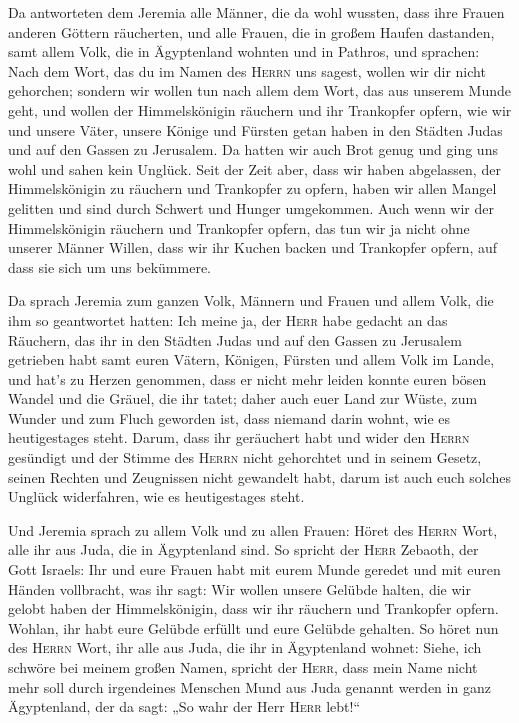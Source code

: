  Da antworteten dem Jeremia alle Männer, die da wohl
wussten, dass ihre Frauen anderen Göttern räucherten, und alle Frauen,
die in großem Haufen dastanden, samt allem Volk, die in Ägyptenland
wohnten und in Pathros, und sprachen:  Nach dem Wort, das
du im Namen des \textsc{Herrn} uns sagest, wollen wir dir nicht
gehorchen;  sondern wir wollen tun nach allem dem Wort,
das aus unserem Munde geht, und wollen der Himmelskönigin räuchern und
ihr Trankopfer opfern, wie wir und unsere Väter, unsere Könige und
Fürsten getan haben in den Städten Judas und auf den Gassen zu
Jerusalem. Da hatten wir auch Brot genug und ging uns wohl und sahen
kein Unglück.  Seit der Zeit aber, dass wir haben
abgelassen, der Himmelskönigin zu räuchern und Trankopfer zu opfern,
haben wir allen Mangel gelitten und sind durch Schwert und Hunger
umgekommen.  Auch wenn wir der Himmelskönigin räuchern
und Trankopfer opfern, das tun wir ja nicht ohne unserer Männer Willen,
dass wir ihr Kuchen backen und Trankopfer opfern, auf dass sie sich um
uns bekümmere.

 Da sprach Jeremia zum ganzen Volk, Männern und Frauen
und allem Volk, die ihm so geantwortet hatten:  Ich meine
ja, der \textsc{Herr} habe gedacht an das Räuchern, das ihr in den
Städten Judas und auf den Gassen zu Jerusalem getrieben habt samt euren
Vätern, Königen, Fürsten und allem Volk im Lande, und hat's zu Herzen
genommen,  dass er nicht mehr leiden konnte euren bösen
Wandel und die Gräuel, die ihr tatet; daher auch euer Land zur Wüste,
zum Wunder und zum Fluch geworden ist, dass niemand darin wohnt, wie es
heutigestages steht.  Darum, dass ihr geräuchert habt und
wider den \textsc{Herrn} gesündigt und der Stimme des \textsc{Herrn}
nicht gehorchtet und in seinem Gesetz, seinen Rechten und Zeugnissen
nicht gewandelt habt, darum ist auch euch solches Unglück widerfahren,
wie es heutigestages steht.

 Und Jeremia sprach zu allem Volk und zu allen Frauen:
Höret des \textsc{Herrn} Wort, alle ihr aus Juda, die in Ägyptenland
sind.  So spricht der \textsc{Herr} Zebaoth, der Gott
Israels: Ihr und eure Frauen habt mit eurem Munde geredet und mit euren
Händen vollbracht, was ihr sagt: Wir wollen unsere Gelübde halten, die
wir gelobt haben der Himmelskönigin, dass wir ihr räuchern und
Trankopfer opfern. Wohlan, ihr habt eure Gelübde erfüllt und eure
Gelübde gehalten.  So höret nun des \textsc{Herrn} Wort,
ihr alle aus Juda, die ihr in Ägyptenland wohnet: Siehe, ich schwöre bei
meinem großen Namen, spricht der \textsc{Herr}, dass mein Name nicht
mehr soll durch irgendeines Menschen Mund aus Juda genannt werden in
ganz Ägyptenland, der da sagt: „So wahr der Herr \textsc{Herr} lebt!{}``

